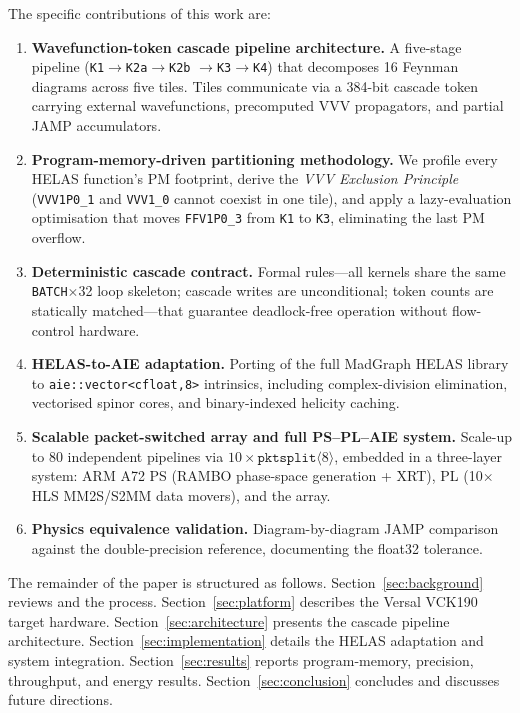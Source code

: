 The specific contributions of this work are:
\begin{enumerate}
  \item \textbf{Wavefunction-token cascade pipeline architecture.}
    A five-stage pipeline (\texttt{K1}$\to$\texttt{K2a}$\to$\texttt{K2b}%
    $\to$\texttt{K3}$\to$\texttt{K4}) that decomposes 16 Feynman diagrams
    across five \aie tiles.  Tiles communicate via a 384-bit cascade token
    carrying external wavefunctions, precomputed VVV propagators, and partial
    JAMP accumulators.

  \item \textbf{Program-memory-driven partitioning methodology.}
    We profile every HELAS function's PM footprint, derive the \textit{VVV
    Exclusion Principle} (\texttt{VVV1P0\_1} and \texttt{VVV1\_0} cannot
    coexist in one tile), and apply a lazy-evaluation optimisation that moves
    \texttt{FFV1P0\_3} from \texttt{K1} to \texttt{K3}, eliminating the last
    PM overflow.

  \item \textbf{Deterministic cascade contract.}
    Formal rules---all kernels share the same \texttt{BATCH}$\times$32 loop
    skeleton; cascade writes are unconditional; token counts are statically
    matched---that guarantee deadlock-free operation without flow-control
    hardware.

  \item \textbf{HELAS-to-AIE adaptation.}
    Porting of the full MadGraph HELAS library to \texttt{aie::vector<cfloat,8>}
    intrinsics, including complex-division elimination, vectorised spinor cores,
    and binary-indexed helicity caching.

  \item \textbf{Scalable packet-switched array and full PS--PL--AIE system.}
    Scale-up to 80 independent pipelines via
    $10\times\texttt{pktsplit}\langle 8\rangle$, embedded in a three-layer
    system: ARM A72 PS (RAMBO phase-space generation + XRT), PL (10$\times$ HLS
    MM2S/S2MM data movers), and the \aie array.

  \item \textbf{Physics equivalence validation.}
    Diagram-by-diagram JAMP comparison against the \mgfive double-precision
    reference, documenting the float32 tolerance.
\end{enumerate}

The remainder of the paper is structured as follows.
Section~\ref{sec:background} reviews \mgfive and the \ggttg process.
Section~\ref{sec:platform} describes the Versal VCK190 target hardware.
Section~\ref{sec:architecture} presents the cascade pipeline architecture.
Section~\ref{sec:implementation} details the HELAS adaptation and system
integration.
Section~\ref{sec:results} reports program-memory, precision, throughput, and
energy results.
Section~\ref{sec:conclusion} concludes and discusses future directions.
